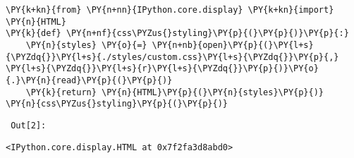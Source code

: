 {\par%
\vspace{-1\baselineskip}%
}%
\begin{notebookcell}[2]%
\begin{addmargin}[\cellleftmargin]{0em}%
{\smaller%
\par%
%
\vspace{-1\smallerfontscale}%
\begin{Verbatim}[commandchars=\\\{\}]
\PY{k+kn}{from} \PY{n+nn}{IPython.core.display} \PY{k+kn}{import} \PY{n}{HTML}
\PY{k}{def} \PY{n+nf}{css\PYZus{}styling}\PY{p}{(}\PY{p}{)}\PY{p}{:}
    \PY{n}{styles} \PY{o}{=} \PY{n+nb}{open}\PY{p}{(}\PY{l+s}{\PYZdq{}}\PY{l+s}{./styles/custom.css}\PY{l+s}{\PYZdq{}}\PY{p}{,} \PY{l+s}{\PYZdq{}}\PY{l+s}{r}\PY{l+s}{\PYZdq{}}\PY{p}{)}\PY{o}{.}\PY{n}{read}\PY{p}{(}\PY{p}{)}
    \PY{k}{return} \PY{n}{HTML}\PY{p}{(}\PY{n}{styles}\PY{p}{)}
\PY{n}{css\PYZus{}styling}\PY{p}{(}\PY{p}{)}
\end{Verbatim}
%
\par%
\vspace{-1\smallerfontscale}}%
\end{addmargin}
\end{notebookcell}

\par\vspace{1\smallerfontscale}%
    
        {\par%
        \vspace{-1\smallerfontscale}%
        \noindent%
        \begin{minipage}{\cellleftmargin}%
    \hfill%
    {\smaller%
    \tt%
    \color{nbframe-out-prompt}%
    Out[2]:}%
    \hspace{\inputpadding}%
    \hspace{0em}%
    \hspace{3pt}%
    \end{minipage}%
        }%
    \begin{addmargin}[\cellleftmargin]{0em}%
    {\smaller%
    \vspace{-1\smallerfontscale}%
    
    
    
    \begin{verbatim}
<IPython.core.display.HTML at 0x7f2fa3d8abd0>
    \end{verbatim}

    
}%
    \end{addmargin}%

